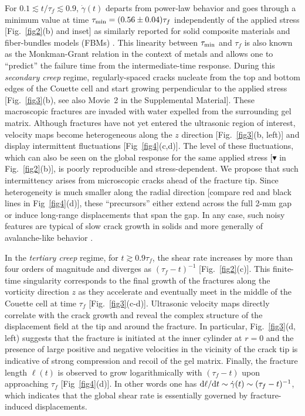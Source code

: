 \documentclass[twocolumn,superscriptaddress,showpacs,preprintnumbers,amsmath,amssymb,prl]{revtex4}
\newcommand\gp{\dot\gamma}
\begin{document}
For $0.1\lesssim t/\tau_f\lesssim 0.9$, $\gp(t)$ departs from power-law behavior and goes through a minimum value at time $\tau_{\rm min}= (0.56\pm0.04)\tau_f$ independently of the applied stress [Fig.~\ref{fig2}(b) and inset] as similarly reported for solid composite materials \cite{Nechad:2005} and fiber-bundles models (FBMs) \cite{Kovacs:2008,Jagla:2011}. This linearity between $\tau_{\rm min}$ and $\tau_f$ is also known as the Monkman-Grant relation in the context of metals \cite{Sundararajan:1989} and allows one to ``predict'' the failure time from the intermediate-time response. During this {\it secondary creep} regime, regularly-spaced cracks nucleate from the top and bottom edges of the Couette cell and start growing perpendicular to the applied stress [Fig.~\ref{fig3}(b), see also Movie~2 in the Supplemental Material]. These macroscopic fractures are invaded with water expelled from the surrounding gel matrix. Although fractures have not yet entered the ultrasonic region of interest, velocity maps become heterogeneous along the $z$ direction [Fig.~\ref{fig3}(b, left)] and display intermittent fluctuations [Fig~\ref{fig4}(c,d)]. The level of these fluctuations, which can also be seen on the global response for the same applied stress [\textcolor{red!50!black}{$\blacktriangledown$} in Fig.~\ref{fig2}(b)], is poorly reproducible and stress-dependent. We propose that such intermittency arises from microscopic cracks ahead of the fracture tip. Since heterogeneity is much smaller along the radial direction [compare red and black lines in Fig~\ref{fig4}(d)], these ``precursors'' either extend across the full 2-mm gap or induce long-range displacements that span the gap. In any case, such noisy features are typical of slow crack growth in solids \cite{Vanel:2009,Kun:2007} and more generally of avalanche-like behavior \cite{Sethna:2001}.

In the {\it tertiary creep} regime, for $t\gtrsim 0.9\tau_f$, the shear rate increases by more than four orders of magnitude and diverges as $(\tau_f-t)^{-1}$ [Fig.~\ref{fig2}(c)]. This finite-time singularity corresponds to the final growth of the fractures along the vorticity direction $z$ as they accelerate and eventually meet in the middle of the Couette cell at time $\tau_f$ [Fig.~\ref{fig3}(c-d)]. Ultrasonic velocity maps directly correlate with the crack growth and reveal the complex structure of the displacement field at the tip and around the fracture. In particular, Fig.~\ref{fig3}(d, left) suggests that the fracture is initiated at the inner cylinder at $r=0$ and the presence of large positive and negative velocities in the vicinity of the crack tip is indicative of strong compression and recoil of the gel matrix. Finally, the fracture length $\ell(t)$ is observed to grow logarithmically with $(\tau_f-t)$ upon approaching $\tau_f$ [Fig~\ref{fig4}(d)]. In other words one has ${\rm d}\ell/{\rm d}t\sim\gp(t)\sim (\tau_f-t)^{-1}$, which indicates that the global shear rate is essentially governed by fracture-induced displacements.
\end{document}
